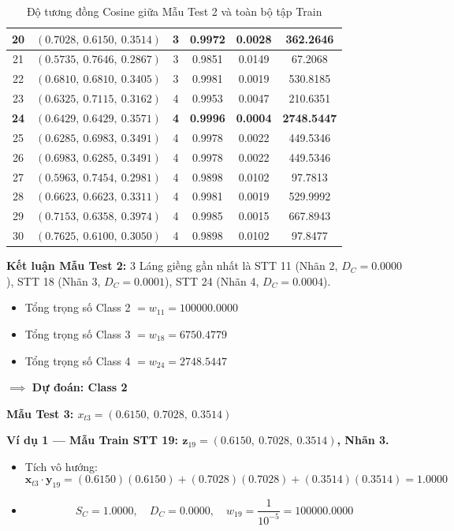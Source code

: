 \documentclass[12pt,a4paper]{article}
\begin{document}
\begin{table}[H]
{\begin{tabular}{|c|c|c|c|c|c|}
20 & $(0.7028,\ 0.6150,\ 0.3514)$ & 3 & 0.9972 & 0.0028 & 362.2646 \\ \hline
21 & $(0.5735,\ 0.7646,\ 0.2867)$ & 3 & 0.9851 & 0.0149 & 67.2068 \\ \hline
22 & $(0.6810,\ 0.6810,\ 0.3405)$ & 3 & 0.9981 & 0.0019 & 530.8185 \\ \hline
23 & $(0.6325,\ 0.7115,\ 0.3162)$ & 4 & 0.9953 & 0.0047 & 210.6351 \\ \hline
\textbf{24} & \textbf{$(0.6429,\ 0.6429,\ 0.3571)$} & \textbf{4} & \textbf{0.9996} & \textbf{0.0004} & \textbf{2748.5447} \\ \hline
25 & $(0.6285,\ 0.6983,\ 0.3491)$ & 4 & 0.9978 & 0.0022 & 449.5346 \\ \hline
26 & $(0.6983,\ 0.6285,\ 0.3491)$ & 4 & 0.9978 & 0.0022 & 449.5346 \\ \hline
27 & $(0.5963,\ 0.7454,\ 0.2981)$ & 4 & 0.9898 & 0.0102 & 97.7813 \\ \hline
28 & $(0.6623,\ 0.6623,\ 0.3311)$ & 4 & 0.9981 & 0.0019 & 529.9992 \\ \hline
29 & $(0.7153,\ 0.6358,\ 0.3974)$ & 4 & 0.9985 & 0.0015 & 667.8943 \\ \hline
30 & $(0.7625,\ 0.6100,\ 0.3050)$ & 4 & 0.9898 & 0.0102 & 97.8477 \\ \hline
\end{tabular}%
}
\caption{Độ tương đồng Cosine giữa Mẫu Test 2 và toàn bộ tập Train}
\end{table}
 
\textbf{Kết luận Mẫu Test 2:} 3 Láng giềng gần nhất là STT 11 (Nhãn 2, $D_C=0.0000$), STT 18 (Nhãn 3, $D_C=0.0001$), STT 24 (Nhãn 4, $D_C=0.0004$).
\begin{itemize}
    \item Tổng trọng số Class 2 $= w_{11} = 100000.0000$
    \item Tổng trọng số Class 3 $= w_{18} = 6750.4779$
    \item Tổng trọng số Class 4 $= w_{24} = 2748.5447$
\end{itemize}
$\implies$ \textbf{Dự đoán: Class 2}
 
\vspace{0.5cm}
 
\textbf{Mẫu Test 3: $x_{t3} = (0.6150,\ 0.7028,\ 0.3514)$}
 
\vspace{0.3cm}
\textbf{Ví dụ 1 — Mẫu Train STT 19: $\mathbf{z}_{19} = (0.6150,\ 0.7028,\ 0.3514)$, Nhãn 3.}
\begin{itemize}
    \item Tích vô hướng:
    \[
        \mathbf{x}_{t3} \cdot \mathbf{y}_{19}
        = (0.6150)(0.6150) + (0.7028)(0.7028) + (0.3514)(0.3514) = 1.0000
    \]
    \item
    \[
        S_C = 1.0000, \quad D_C = 0.0000, \quad
        w_{19} = \frac{1}{10^{-5}} = 100000.0000
    \]
\end{itemize}
 
\end{document}
